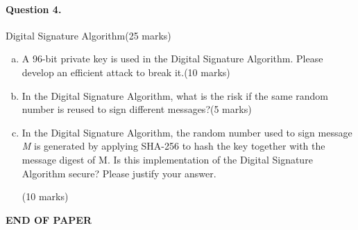 \documentclass[12pt]{article}
\begin{document}
\newpage
\paragraph{Question 4.}   Digital Signature Algorithm\hfill (25 marks)
\begin{enumerate}[(a)]
    \item A 96-bit private key is used in the Digital Signature Algorithm. Please develop an efficient attack to break it.\hfill (10 marks)
    \item In the Digital Signature Algorithm, what is the risk if the same random number is reused to sign different messages?\hfill (5 marks)
    \item In the Digital Signature Algorithm, the random number used to sign message \textit{M} is generated by applying SHA-256 to hash the key together with the message digest of M. Is this implementation of the Digital Signature Algorithm secure? Please justify your answer.{\vspace{-2.5em}\begin{flushright} (10 marks)\end{flushright}}
\end{enumerate}
\bigskip
\vfill
\begin{center}{\bf END OF PAPER}\end{center}
\end{document}
